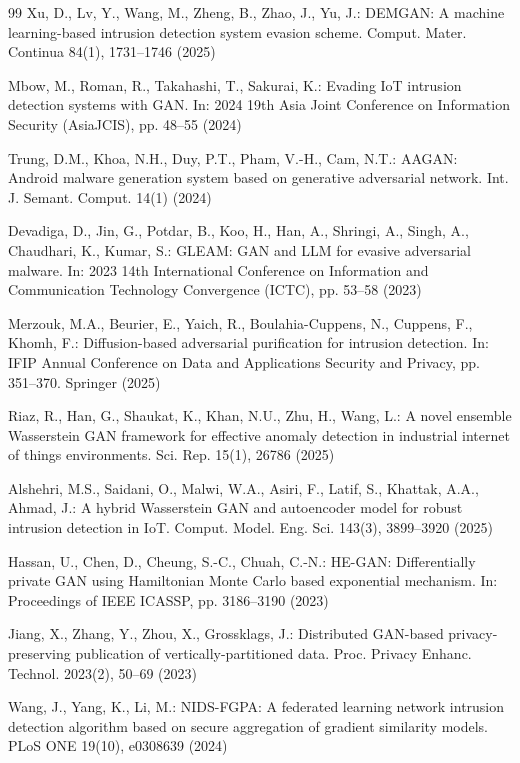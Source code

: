 \documentclass[11pt, a4paper]{article}
\begin{document}
\begin{thebibliography}{99}
Xu, D., Lv, Y., Wang, M., Zheng, B., Zhao, J., Yu, J.: DEMGAN: A machine learning-based intrusion detection system evasion scheme. Comput. Mater. Continua 84(1), 1731--1746 (2025)

Mbow, M., Roman, R., Takahashi, T., Sakurai, K.: Evading IoT intrusion detection systems with GAN. In: 2024 19th Asia Joint Conference on Information Security (AsiaJCIS), pp. 48--55 (2024)

Trung, D.M., Khoa, N.H., Duy, P.T., Pham, V.-H., Cam, N.T.: AAGAN: Android malware generation system based on generative adversarial network. Int. J. Semant. Comput. 14(1) (2024)

Devadiga, D., Jin, G., Potdar, B., Koo, H., Han, A., Shringi, A., Singh, A., Chaudhari, K., Kumar, S.: GLEAM: GAN and LLM for evasive adversarial malware. In: 2023 14th International Conference on Information and Communication Technology Convergence (ICTC), pp. 53--58 (2023)

Merzouk, M.A., Beurier, E., Yaich, R., Boulahia-Cuppens, N., Cuppens, F., Khomh, F.: Diffusion-based adversarial purification for intrusion detection. In: IFIP Annual Conference on Data and Applications Security and Privacy, pp. 351--370. Springer (2025)

Riaz, R., Han, G., Shaukat, K., Khan, N.U., Zhu, H., Wang, L.: A novel ensemble Wasserstein GAN framework for effective anomaly detection in industrial internet of things environments. Sci. Rep. 15(1), 26786 (2025)

Alshehri, M.S., Saidani, O., Malwi, W.A., Asiri, F., Latif, S., Khattak, A.A., Ahmad, J.: A hybrid Wasserstein GAN and autoencoder model for robust intrusion detection in IoT. Comput. Model. Eng. Sci. 143(3), 3899--3920 (2025)

Hassan, U., Chen, D., Cheung, S.-C., Chuah, C.-N.: HE-GAN: Differentially private GAN using Hamiltonian Monte Carlo based exponential mechanism. In: Proceedings of IEEE ICASSP, pp. 3186--3190 (2023)

Jiang, X., Zhang, Y., Zhou, X., Grossklags, J.: Distributed GAN-based privacy-preserving publication of vertically-partitioned data. Proc. Privacy Enhanc. Technol. 2023(2), 50--69 (2023)

Wang, J., Yang, K., Li, M.: NIDS-FGPA: A federated learning network intrusion detection algorithm based on secure aggregation of gradient similarity models. PLoS ONE 19(10), e0308639 (2024)


\end{thebibliography}
\end{document}
